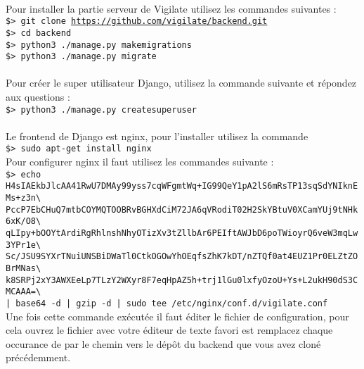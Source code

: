 \\
Pour installer la partie serveur de Vigilate utilisez les commandes suivantes :\\
\texttt{\$> git clone \url{https://github.com/vigilate/backend.git}}\\
\texttt{\$> cd backend}\\
\texttt{\$> python3 ./manage.py makemigrations}\\
\texttt{\$> python3 ./manage.py migrate}\\
\\
Pour créer le super utilisateur Django, utilisez la commande suivante et répondez aux questions :\\
\texttt{\$> python3 ./manage.py createsuperuser}\\
\\
Le frontend de Django est nginx, pour l’installer utilisez la commande\\
\texttt{\$> sudo apt-get install nginx}\\
Pour configurer nginx il faut utilisez les commandes suivante :\\
\texttt{\$> echo H4sIAEkbJlcAA41RwU7DMAy99yss7cqWFgmtWq+IG99QeY1pA2lS6mRsTP13sqSdYNIknEMs+z3n\textbackslash{}\\
PccP7EbCHuQ7mtbCOYMQTOOBRvBGHXdCiM72JA6qVRodiT02H2SkYBtuV0XCamYUj9tNHk6xK/O8\textbackslash{}\\
qLIpy+bOOYtArdiRgRhlnshNhyOTizXv3tZllbAr6PEIftAWJbD6poTWioyrQ6veW3mqLw3YPr1e\textbackslash{}\\
Sc/JSU9SYXrTNuiUNSBiDWaTl0CtkOGOwYhOEqfsZhK7kDT/nZTQf0at4EUZ1Pr0ELZtZOBrMNas\textbackslash{}\\
k8SRPj2xY3AWXEeLp7TLzY2WXyr8F7eqHpAZ5h+trj1lGu0lxfyOzoU+Ys+L2ukH90dS3CMCAAA=\textbackslash{}\\
| base64 -d | gzip -d | sudo tee /etc/nginx/conf.d/vigilate.conf}\\
Une fois cette commande exécutée il faut éditer le fichier de configuration, pour cela ouvrez le fichier  avec votre éditeur de texte favori est remplacez chaque occurance de  par le chemin vers le dépôt du backend que vous avez cloné précédemment.\\
\\
